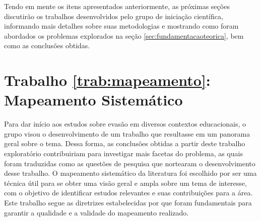 \documentclass[12pt]{article}
\begin{document}





Tendo em mente os itens apresentados anteriormente, as próximas seções discutirão os trabalhos desenvolvidos pelo grupo de iniciação científica, informando mais detalhes sobre suas metodologias e mostrando como foram abordados os problemas explorados na seção \ref{sec:fundamentacaoteorica}, bem como as conclusões obtidas.


\section{Trabalho \ref{trab:mapeamento}: Mapeamento Sistemático}
\label{sec:mapeamento}


Para dar início aos estudos sobre evasão em diversos contextos educacionais, o grupo visou o desenvolvimento de um trabalho que resultasse em um panorama geral sobre o tema. Dessa forma, as conclusões obtidas a partir deste trabalho exploratório contribuiriam para investigar mais facetas do problema, as quais foram traduzidas como as questões de pesquisa que nortearam o desenvolvimento desse trabalho. O mapeamento sistemático da literatura foi escolhido por ser uma técnica útil para se obter uma visão geral e ampla sobre um tema de interesse, com o objetivo de identificar estudos relevantes e suas contribuições para a área. Este trabalho segue as diretrizes estabelecidas por \cite{petersen:2015} que foram fundamentais para garantir a qualidade e a validade do mapeamento realizado.
\end{document}
